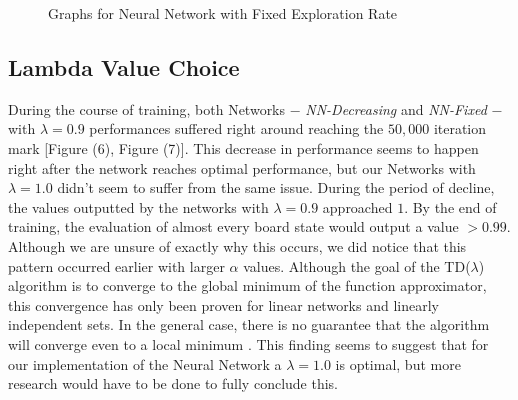 \documentclass{sig-alternate-05-2015}
\begin{document}
\begin{figure}[p]
\centering
{}
\caption{Graphs for Neural Network with Fixed Exploration Rate}
\label{fig:graph5}
\end{figure}


\subsection{Lambda Value Choice}
During the course of training, both Networks $-$ \emph{NN-Decreasing} and \emph{NN-Fixed} $-$ with $\lambda = 0.9$ performances suffered right around reaching the $50,000$ iteration mark [Figure (6), Figure (7)]. This decrease in performance seems to happen right after the network reaches optimal performance, but our Networks with  $\lambda = 1.0$   didn't seem to suffer from the same issue. During the period of decline, the values outputted by the networks with $\lambda = 0.9$ approached $1$. By the end of training, the evaluation of almost every board state would output a value $> 0.99$. Although we are unsure of exactly why this occurs, we did notice that this pattern occurred earlier with larger $\alpha$ values. Although the goal of the TD($\lambda$) algorithm is to converge to the global minimum of the function approximator, this convergence has only been proven for linear networks and linearly independent sets. In the general case, there is no guarantee that the algorithm will converge even to a local minimum \cite{tesauro1992practical}. This finding seems to suggest that for our implementation of the Neural Network a $\lambda = 1.0$ is optimal, but more research would have to be done to fully conclude this.
\end{document}

